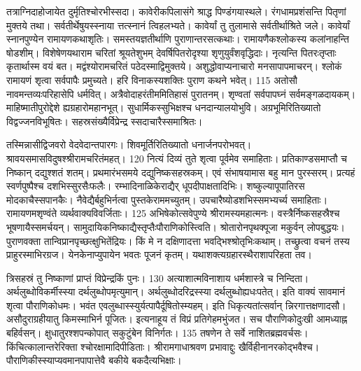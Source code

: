 तत्राग्निदाहोजायेत दुर्मृतिश्चोरभीस्सदा।
 कावेरीकपिलासंगे श्राद्ध पिण्डंगयास्थले।
 रंगधामप्रशंसन्ति पितृणां मुक्तये तथा।
 सर्वतीर्थेषुयस्स्नाया त्तत्स्नानं त्विहलभ्यते।
 कावेर्यां तु तुलामासे सर्वतीर्थाश्रिते जले।
 कावेर्यां स्नानपुण्येन रामायणकथाशृतिः।
 समस्तयज्ञतीर्थाणि पुराणान्तरसत्कथाः।
 रामायणैकश्लोकस्य कलांनाहन्ति षोडशीम्।
 विशेषेणयथाराम चरितां श्रूयतेशुभम् देवर्षिपितरोदृश्या शृणुयुर्वंशवृद्धिदाः।
 नृत्यन्ति पितरःतृप्ताः कृतार्थास्म वयं बत।
 मद्वंश्योरामचरितं पठेदस्माद्विमुक्तये।
 अशुद्धोवाप्यनाचारो मनसापापमाचरन्।
 श्लोकं रामायणं शृत्वा सर्वपापैः प्रमुच्यते।
 हरि विनाकस्यशक्तिः पुराण कथने भवेत्।
 115 अतोसौ नावमन्तव्यःपरिहासेपि धर्मवित्।
 अत्रैवोदाहरंतीममितिहासं पुरातनम्।
 शृण्वतां सर्वपापघ्नं सर्वमङ्गळदायकम्।
 माहिष्मातीपुरोद्देशे ह्यग्रहारोमहानभूत्।
 सुधार्मिकस्सुभिक्षश्च धनदान्यालयोभुवि।
 अग्रभूमिरितिख्यातो विद्वज्जनविभूषितः।
 सहस्रसंख्यैर्विप्रेन्द्र स्सदाचारैस्समाश्रितः।
 
तस्मिन्नासीद्विजवरो वेदवेदान्तपारगः।
 शिवमूर्तिरितिख्यातो धनार्जनपरोभवत्।
 श्रावयसमासविदुषश्श्रीरामचरितंमहत्।
 120 नित्यं दिव्यं तुते शृत्वा पूर्वमेव समाहिताः।
 प्रतिकाण्डसमाप्तौ च निष्कान् दद्युश्शतं शतम्।
 प्रथमारंभसमये दद्युनिष्कसहस्रकम्।
 एवं संभाषयामास बहु मान पुरस्सरम्।
 प्रत्यहं स्वर्णपुष्पैश्च दशभिस्सुरसैःफलैः।
 रम्भादिनाळिकेराद्यैर् धूपदीपाक्षतादिभिः।
 शष्कुल्यापूपातिरस मोदकाचैस्सपानकैः।
 नैवेद्यैर्बहुभिर्नत्वा पुस्तकेराममच्युतम्।
 उपचारैष्योडशभिस्समभ्यर्च्य समाहिताः।
 रामायणमशृण्वंते व्यर्थवाक्यविवर्जिताः।
 125 अभिषेकोत्सवेपुण्ये श्रीरामस्यमहात्मनः।
 वस्त्रैर्निष्कसहस्रैश्च भूषणायैस्समर्चयन्।
 सामुदायिकनिष्काद्यैस्तृप्तैःपौराणिकोस्त्विति।
 श्रोतारोनपृथक्पूजा मकुर्वन् लोपबुद्धयः।
 पुराणवक्ता तान्विप्रानपृच्छत्क्षुभितेंद्रियः।
 किं मे न दक्षिणादत्ता भवद्भिश्श्रोतृभिःकथाम्।
 तच्छ्रुत्वा वचनं तस्य प्राहुरस्माभिरग्रज।
 येनकेनाप्युपायेन भवतः पूजनं कृतम्।
 यथाशक्त्यग्रहारस्थैराशापरिहता तव।
 
त्रिसहस्रं तु निष्काणां प्राप्तं विप्रेन्द्रकिं पुनः।
 130 अत्याशात्मविनाशाय धर्मशास्त्रे च निन्दिता।
 अर्थलुब्धोविकर्मीस्स्या दर्थलुब्धोपमृत्युमान्।
 अर्थलुब्धोदरिद्रस्स्या दर्थलुब्धोह्यधःपतेत्।
 इति वाक्यं सावमानं शृत्वा पौराणिकोधमः।
 भवंत एवलुब्धास्स्युर्यत्पापैर्दूषितोस्म्यहम्।
 इति धिकृत्यतांत्सर्वान् न्निरगात्तक्षणादसौ।
 असौदुराग्रहीयातु किमस्माभिर्न पूजितः।
 इत्यनाहूय तं विप्रं प्रतिगेहमभुंजत।
 सच पौराणिकोदुःखी आमध्याह्न बहिर्वसन्।
 क्षुधातुरश्शपन्कोपात् सकुटुंबेन विनिर्गतः।
 135 तषणेन ते सर्वे नाशितब्रह्मवर्चसः।
 किंचित्कालान्तरेरिक्ता श्चोरक्षामादिपीडिताः।
 श्रीरामगाधाश्रवण प्रभावाद्दुः
खैर्विहीनानरकोद्भवैश्च।
 पौराणिकीस्स्याप्यवमानपापात्तेवै
बकीये बकदैत्यभिक्षाः।

